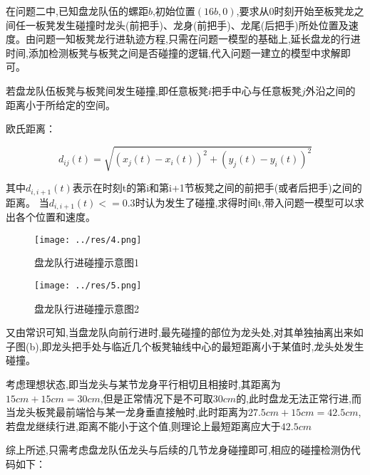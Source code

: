 
在问题二中,已知盘龙队伍的螺距$b$,初始位置$(16b,0)$,要求从$0$时刻开始至板凳龙之间任一板凳发生碰撞时龙头(前把手)、龙身(前把手)、龙尾(后把手)所处位置及速度。由问题一知板凳龙行进轨迹方程,只需在问题一模型的基础上,延长盘龙的行进时间,添加检测板凳与板凳之间是否碰撞的逻辑,代入问题一建立的模型中求解即可。


若盘龙队伍板凳与板凳间发生碰撞,即任意板凳$i$把手中心与任意板凳$j$外沿之间的距离小于所给定的空间。

欧氏距离：

\begin{equation}
	d_{ij}(t)=\sqrt{(x_j(t)-x_i(t))^2+(y_j(t)-y_i(t))^2}
\end{equation}

其中$d_{i,i+1}(t)$表示在时刻t的第i和第i+1节板凳之间的前把手(或者后把手)之间的距离。
当$d_{i,i+1}(t)<=0.3$时认为发生了碰撞,求得时间t,带入问题一模型可以求出各个位置和速度。


\begin{figure}[htbp]
	\centering
	\texttt{[image: ../res/4.png]}
	\caption{盘龙队行进碰撞示意图1}
	\label{fig:盘龙队行进碰撞示意图1}
\end{figure}

\begin{figure}[htbp]
	\centering
	\texttt{[image: ../res/5.png]}
	\caption{盘龙队行进碰撞示意图2}
	\label{fig:盘龙队行进碰撞示意图2}
\end{figure}

又由常识可知,当盘龙队向前行进时,最先碰撞的部位为龙头处,对其单独抽离出来如子图(b),即龙头把手处与临近几个板凳轴线中心的最短距离小于某值时,龙头处发生碰撞。

考虑理想状态,即当龙头与某节龙身平行相切且相接时,其距离为$15cm + 15cm = 30cm$,但是正常情况下是不可取$30cm$的,此时盘龙无法正常行进,而当龙头板凳最前端恰与某一龙身垂直接触时,此时距离为$27.5cm + 15cm = 42.5cm$,若盘龙继续行进,距离不能小于这个值,则理论上最短距离应大于$42.5cm$

综上所述,只需考虑盘龙队伍龙头与后续的几节龙身碰撞即可,相应的碰撞检测伪代码如下：

